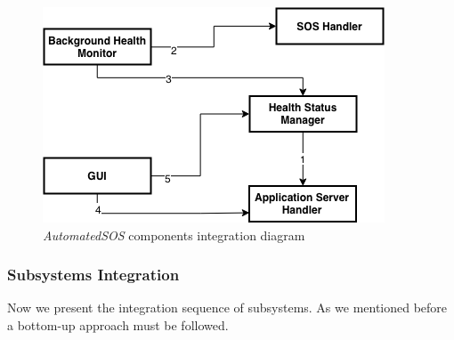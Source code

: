 \begin{figure}[H]
  \begin{center}
  	\includegraphics[width=\textwidth]{./img/automatedIntegration.png}
    \hspace{0.05\linewidth}
    \centering
    \caption{\textit{AutomatedSOS} components integration diagram}
		\label{img:automatedIntegrationDiagram}
    \end{center}
\end{figure}

\subsubsection{Subsystems Integration}
Now we present the integration sequence of subsystems. As we mentioned before a bottom-up approach must be followed.

